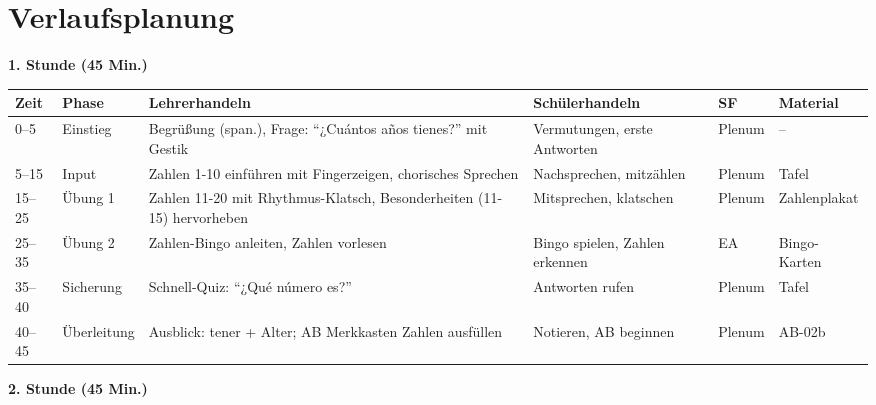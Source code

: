 \documentclass[11pt,a4paper]{article}
\begin{document}
\section{Verlaufsplanung}

\textbf{1. Stunde (45 Min.)}

\begin{longtable}{|p{1cm}|p{1.5cm}|p{4cm}|p{3cm}|p{1.5cm}|p{2cm}|}
\hline
\textbf{Zeit} & \textbf{Phase} & \textbf{Lehrerhandeln} & \textbf{Schülerhandeln} & \textbf{SF} & \textbf{Material} \\
\hline
\endhead

0--5 & Einstieg & Begrüßung (span.), Frage: ``¿Cuántos años tienes?'' mit Gestik & Vermutungen, erste Antworten & Plenum & -- \\
\hline

5--15 & Input & Zahlen 1-10 einführen mit Fingerzeigen, chorisches Sprechen & Nachsprechen, mitzählen & Plenum & Tafel \\
\hline

15--25 & Übung 1 & Zahlen 11-20 mit Rhythmus-Klatsch, Besonderheiten (11-15) hervorheben & Mitsprechen, klatschen & Plenum & Zahlenplakat \\
\hline

25--35 & Übung 2 & Zahlen-Bingo anleiten, Zahlen vorlesen & Bingo spielen, Zahlen erkennen & EA & Bingo-Karten \\
\hline

35--40 & Sicherung & Schnell-Quiz: ``¿Qué número es?'' & Antworten rufen & Plenum & Tafel \\
\hline

40--45 & Überleitung & Ausblick: tener + Alter; AB Merkkasten Zahlen ausfüllen & Notieren, AB beginnen & Plenum & AB-02b \\
\hline
\end{longtable}

\vspace{1em}

\textbf{2. Stunde (45 Min.)}
\end{document}
